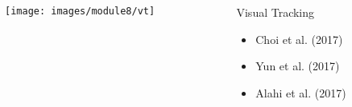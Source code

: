 \begin{frame}
	\begin{columns}
		\begin{column}{0.6\textwidth}
			\vspace{0.2in}
			\begin{overlayarea}{\textwidth}{\textheight}
				\texttt{[image: images/module8/vt]}
			\end{overlayarea}
		\end{column}

		\begin{column}{0.4\textwidth}
			\begin{overlayarea}{\textwidth}{\textheight}

				\begin{block}{Visual Tracking
					}
					\begin{itemize}
						\item Choi et al. (2017) \cite{DBLP:journals/corr/ChoiKL17}
						\item Yun et al. (2017) \cite{DBLP:conf/cvpr/YunCYYC17}
						\item Alahi et al. (2017) \cite{DBLP:journals/corr/SadeghianAS17}
					\end{itemize}
				\end{block}
			\end{overlayarea}
		\end{column}

	\end{columns}
\end{frame}

